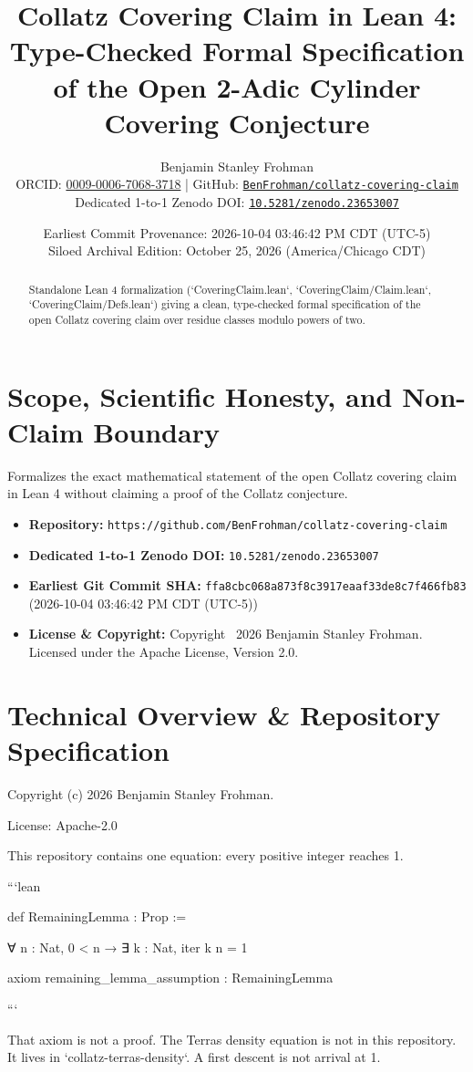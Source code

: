 \documentclass[11pt,a4paper]{article}
\title{\textbf{Collatz Covering Claim in Lean 4: Type-Checked Formal Specification of the Open 2-Adic Cylinder Covering Conjecture}}
\author{Benjamin Stanley Frohman\\
\small ORCID: \href{https://orcid.org/0009-0006-7068-3718}{0009-0006-7068-3718} \quad|\quad
GitHub: \href{https://github.com/BenFrohman/collatz-covering-claim}{\texttt{BenFrohman/collatz-covering-claim}}\\
\small Dedicated 1-to-1 Zenodo DOI: \href{https://doi.org/10.5281/zenodo.23653007}{\texttt{10.5281/zenodo.23653007}}}
\date{Earliest Commit Provenance: 2026-10-04 03:46:42 PM CDT (UTC-5)\\
Siloed Archival Edition: October 25, 2026 (America/Chicago CDT)}
\begin{document}
\maketitle

\begin{abstract}
Standalone Lean 4 formalization (`CoveringClaim.lean`, `CoveringClaim/Claim.lean`, `CoveringClaim/Defs.lean`) giving a clean, type-checked formal specification of the open Collatz covering claim over residue classes modulo powers of two.
\end{abstract}

\section{Scope, Scientific Honesty, and Non-Claim Boundary}
Formalizes the exact mathematical statement of the open Collatz covering claim in Lean 4 without claiming a proof of the Collatz conjecture.

\begin{itemize}
  \item \textbf{Repository:} \texttt{https://github.com/BenFrohman/collatz-covering-claim}
  \item \textbf{Dedicated 1-to-1 Zenodo DOI:} \texttt{10.5281/zenodo.23653007}
  \item \textbf{Earliest Git Commit SHA:} \texttt{ffa8cbc068a873f8c3917eaaf33de8c7f466fb83} (2026-10-04 03:46:42 PM CDT (UTC-5))
  \item \textbf{License \& Copyright:} Copyright \textcopyright\ 2026 Benjamin Stanley Frohman. Licensed under the Apache License, Version 2.0.
\end{itemize}

\section{Technical Overview \& Repository Specification}
Copyright (c) 2026 Benjamin Stanley Frohman.

License: Apache-2.0

This repository contains one equation: every positive integer reaches 1.

```lean

def RemainingLemma : Prop :=

∀ n : Nat, 0 < n → ∃ k : Nat, iter k n = 1

axiom remaining\_lemma\_assumption : RemainingLemma

```

That axiom is not a proof. The Terras density equation is not in this repository. It lives in `collatz-terras-density`. A first descent is not arrival at 1.
\end{document}
